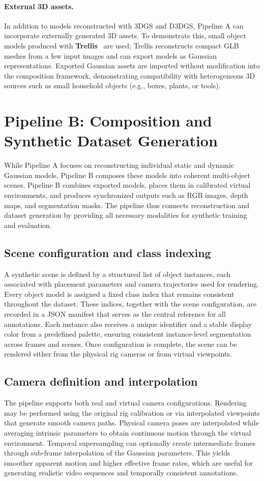 \paragraph{External 3D assets.}
In addition to models reconstructed with 3DGS and D3DGS, Pipeline A can incorporate externally generated 3D assets. To demonstrate this, small object models produced with \textbf{Trellis}~\cite{xiang2024structured} are used; Trellis reconstructs compact GLB meshes from a few input images and can export models as Gaussian representations. Exported Gaussian assets are imported without modification into the composition framework, demonstrating compatibility with heterogeneous 3D sources such as small household objects (e.g., boxes, plants, or tools).

\section{Pipeline B: Composition and Synthetic Dataset Generation}

While Pipeline A focuses on reconstructing individual static and dynamic Gaussian models, Pipeline B composes these models into coherent multi-object scenes. Pipeline B combines exported models, places them in calibrated virtual environments, and produces synchronized outputs such as RGB images, depth maps, and segmentation masks. The pipeline thus connects reconstruction and dataset generation by providing all necessary modalities for synthetic training and evaluation.

\subsection{Scene configuration and class indexing}
A synthetic scene is defined by a structured list of object instances, each associated with placement parameters and camera trajectories used for rendering. Every object model is assigned a fixed class index that remains consistent throughout the dataset. These indices, together with the scene configuration, are recorded in a JSON manifest that serves as the central reference for all annotations. Each instance also receives a unique identifier and a stable display color from a predefined palette, ensuring consistent instance-level segmentation across frames and scenes. Once configuration is complete, the scene can be rendered either from the physical rig cameras or from virtual viewpoints.

\subsection{Camera definition and interpolation}
The pipeline supports both real and virtual camera configurations. Rendering may be performed using the original rig calibration or via interpolated viewpoints that generate smooth camera paths. Physical camera poses are interpolated while averaging intrinsic parameters to obtain continuous motion through the virtual environment. Temporal supersampling can optionally create intermediate frames through sub-frame interpolation of the Gaussian parameters. This yields smoother apparent motion and higher effective frame rates, which are useful for generating realistic video sequences and temporally consistent annotations.

